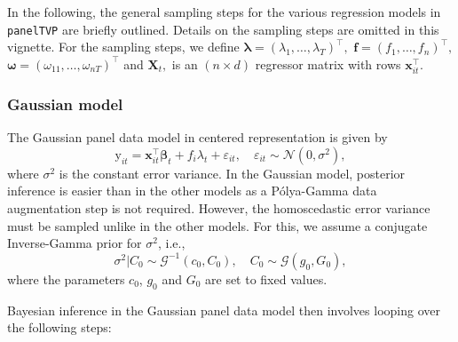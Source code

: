 \documentclass[a4paper, preprint, 3p,
authoryear]{elsarticle} %
\begin{document}
In the following, the general sampling steps for the various regression
models in \texttt{panelTVP} are briefly outlined. Details on the
sampling steps are omitted in this vignette. For the sampling steps, we
define \(\boldsymbol{\lambda} = (\lambda_1,\dots,\lambda_T)^\top,\)
\(\mathbf{f} = (f_1,\dots,f_n)^\top,\)
\(\boldsymbol{\omega}=(\omega_{11},\dots,\omega_{nT})^\top\) and
\(\textbf{X}_t,\) is an \((n\times d)\) regressor matrix with rows
\(\textbf{x}_{it}^\top.\)

\subsubsection{Gaussian model}\label{gaussian-model}

The Gaussian panel data model in centered representation is given by
\begin{equation*}
 \text{y}_{it} = \textbf{x}_{it}^\top \boldsymbol{\beta}_t + f_i\lambda_t + \varepsilon_{it}, \quad \varepsilon_{it} \sim \mathcal{N}(0,\sigma^2),
\end{equation*} where \(\sigma^2\) is the constant error variance. In
the Gaussian model, posterior inference is easier than in the other
models as a Pólya-Gamma data augmentation step is not required. However,
the homoscedastic error variance must be sampled unlike in the other
models. For this, we assume a conjugate Inverse-Gamma prior for
\(\sigma^2\), i.e., \begin{equation*}
 \sigma^2|C_0 \sim \mathcal{G}^{-1}(c_0, C_0), \quad C_0 \sim \mathcal{G}(g_0,G_0),
\end{equation*} where the parameters \(c_0\), \(g_0\) and \(G_0\) are
set to fixed values.

Bayesian inference in the Gaussian panel data model then involves
looping over the following steps:
\end{document}
